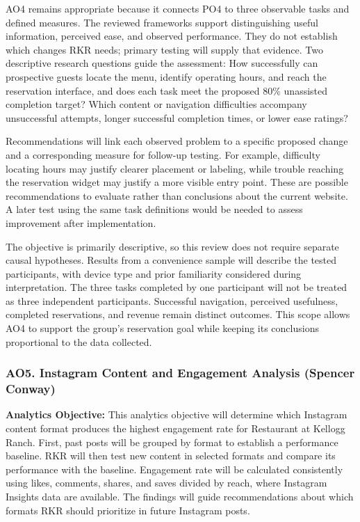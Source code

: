 \documentclass[
  12pt,
  letterpaper,
  DIV=11,
  numbers=noendperiod]{scrartcl}
\begin{document}
AO4 remains appropriate because it connects PO4 to three observable
tasks and defined measures. The reviewed frameworks support
distinguishing useful information, perceived ease, and observed
performance. They do not establish which changes RKR needs; primary
testing will supply that evidence. Two descriptive research questions
guide the assessment: How successfully can prospective guests locate the
menu, identify operating hours, and reach the reservation interface, and
does each task meet the proposed 80\% unassisted completion target?
Which content or navigation difficulties accompany unsuccessful
attempts, longer successful completion times, or lower ease ratings?

Recommendations will link each observed problem to a specific proposed
change and a corresponding measure for follow-up testing. For example,
difficulty locating hours may justify clearer placement or labeling,
while trouble reaching the reservation widget may justify a more visible
entry point. These are possible recommendations to evaluate rather than
conclusions about the current website. A later test using the same task
definitions would be needed to assess improvement after implementation.

The objective is primarily descriptive, so this review does not require
separate causal hypotheses. Results from a convenience sample will
describe the tested participants, with device type and prior familiarity
considered during interpretation. The three tasks completed by one
participant will not be treated as three independent participants.
Successful navigation, perceived usefulness, completed reservations, and
revenue remain distinct outcomes. This scope allows AO4 to support the
group's reservation goal while keeping its conclusions proportional to
the data collected.

\subsubsection{\texorpdfstring{\textbf{AO5. Instagram Content and
Engagement Analysis (Spencer
Conway)}}{AO5. Instagram Content and Engagement Analysis (Spencer Conway)}}\label{ao5.-instagram-content-and-engagement-analysis-spencer-conway}

\textbf{Analytics Objective:} This analytics objective will determine
which Instagram content format produces the highest engagement rate for
Restaurant at Kellogg Ranch. First, past posts will be grouped by format
to establish a performance baseline. RKR will then test new content in
selected formats and compare its performance with the baseline.
Engagement rate will be calculated consistently using likes, comments,
shares, and saves divided by reach, where Instagram Insights data are
available. The findings will guide recommendations about which formats
RKR should prioritize in future Instagram posts.
\end{document}

